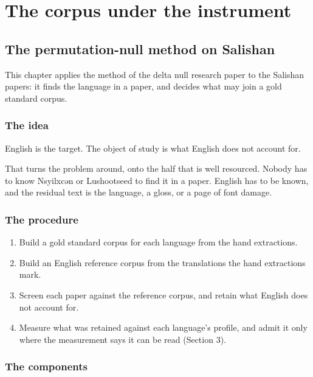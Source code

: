 \chapter{The corpus under the instrument}



\section{The permutation-null method on Salishan}

This chapter applies the method of the delta null research paper \cite{src:Quigg-delta-null} to the Salishan papers: it finds the language in a paper, and decides what may join a gold standard corpus.

\subsection{The idea}

English is the target. The object of study is what English does not account for.

That turns the problem around, onto the half that is well resourced. Nobody has to know Nsyilxcən or Lushootseed to find it in a paper. English has to be known, and the residual text is the language, a gloss, or a page of font damage.

\subsection{The procedure}

\begin{enumerate}
\item Build a gold standard corpus for each language from the hand extractions.
\item Build an English reference corpus from the translations the hand extractions mark.
\item Screen each paper against the reference corpus, and retain what English does not account for.
\item Measure what was retained against each language's profile, and admit it only where the measurement says it can be read (Section 3).
\end{enumerate}

\subsection{The components}

